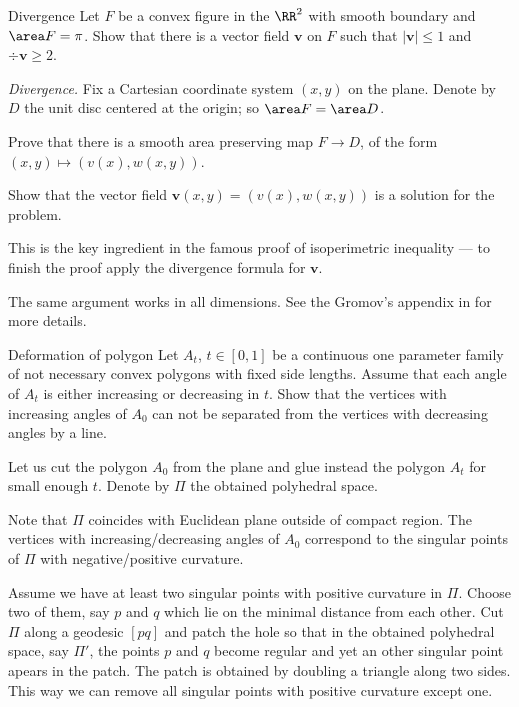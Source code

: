\begin{pr}{}{Divergence}\label{Divergence} %
Let $F$ be a convex figure in the $\RR^2$ with smooth boundary
and $\area F=\pi$.
Show that there is a vector field $\bm{v}$ on $F$
such that $|\bm{v}|\le 1$ and $\div \bm{v}\ge 2$. 
\end{pr}

\textit{Divergence.}
Fix a Cartesian coordinate system $(x,y)$ on the plane.
Denote by $D$ the unit disc centered at the origin;
so $\area F=\area D$.
 
Prove that there is a smooth area preserving map $F\to D$, 
of the form
$(x,y)\mapsto (v(x),w(x,y))$.

Show that the vector field $\bm{v}(x,y)=(v(x),w(x,y))$
is a solution for the problem.

This is the key ingredient in the famous proof of isoperimetric inequality --- to finish the proof apply the divergence formula for $\bm{v}$.

The same argument works in all dimensions.
See the Gromov's appendix in \cite{gromov-apendix} for more details.












\begin{pr}{}{Deformation of polygon}\label{Deformation of polygon}
Let $A_t$, $t\in [0,1]$ be a continuous one parameter family of not necessary convex polygons with fixed side lengths.
Assume that each angle of $A_t$ is either increasing or decreasing in $t$.
Show that the vertices with increasing angles of $A_0$
can not be separated from the vertices with decreasing angles by a line.
\end{pr}


Let us cut the polygon $A_0$ from the plane and glue instead the polygon $A_t$ for small enough $t$.
Denote by $\Pi$ the obtained polyhedral space.

Note that 
$\Pi$ coincides with Euclidean plane outside of compact region.
The vertices with increasing/decreasing angles of $A_0$ 
correspond to the singular points of $\Pi$ with negative/positive curvature.

Assume we have at least two singular points with positive curvature in $\Pi$.
Choose two of them, 
say $p$ and $q$ which lie on the minimal distance from each other. 
Cut $\Pi$ along a geodesic $[pq]$
and patch the hole 
so that in the obtained polyhedral space, say $\Pi'$, 
the points $p$ and $q$ become regular and yet an other singular point apears in the patch. 
The patch is obtained by doubling a triangle along  two sides.
This way we can remove all singular points with positive curvature except one.

